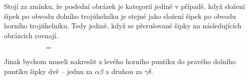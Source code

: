 \documentclass[letterpaper,11pt,leqno]{article}
\begin{document}
\begin{example}
 Stojí za zmínku, že poslední obrázek je kategorií jedině v případě, když
 složení šipek po obvodu dolního trojúhelníku je stejné jako složení šipek po
 obvodu horního trojúhelníku. Tedy jedině, když se přerušované šipky na
 následujících obrázcích rovnají.
 \begin{figure}[H]
  \centering
  \begin{subfigure}[b]{.4\textwidth}
   \raggedleft
  \end{subfigure}
  \begin{subfigure}[H]{.1\textwidth}
   \centering
   \vspace{3pt}
   {\huge $=$}
  \end{subfigure}
  \begin{subfigure}[b]{.4\textwidth}
   \raggedright
  \end{subfigure}
 \end{figure}
 Jinak bychom museli nakreslit z levého horního puntíku do pravého dolního
 puntíku šipky dvě -- jednu za $\alpha\beta$ a druhou za $\gamma\delta$.
\end{example}
\end{document}
